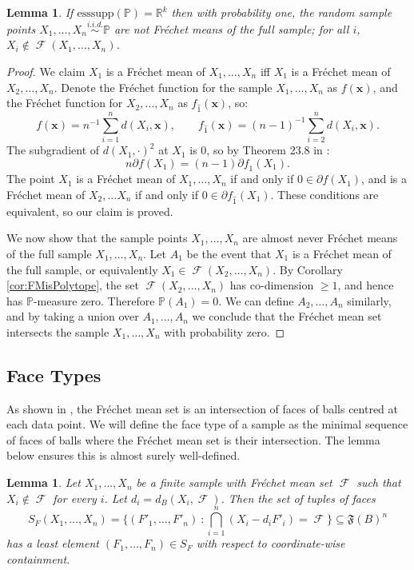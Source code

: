 \documentclass[10pt]{article}
\newtheorem{lemma}[theorem]{Lemma}
\theoremstyle{definition}
\theoremstyle{remark}
\newcommand{\R}{\mathbb{R}}
\newcommand{\esssupp}{\mathrm{esssupp}}
\newcommand{\sample}{ X_1,\dots, X_n}
\DeclareMathOperator{\FMset}{\mathcal{F}}
\renewcommand{\vec}[1]{\mathbf{#1}}
\begin{document}
	\begin{lemma}\label{lemma:data_is_not_FM}
		If $\esssupp(\mathbb P) = \R^k$ then with probability one, the random sample points $ \sample \overset{i.i.d.}{\sim} \mathbb P$ are not Fr\'echet means of the full sample; for all $i$, $X_i \notin \FMset(\sample)$.
	\end{lemma}
	\begin{proof}
		We claim $X_1$ is a Fr\'echet mean of $\sample$ iff $X_1$ is a Fr\'echet mean of $X_2, \dots, X_n$. Denote the Fr\'echet function for the sample $\sample$ as $f(\vec x)$, and the Fr\'echet function for $X_2, \dots, X_n$ as $f_{\hat{1}}(\vec x)$, so:
		\[
		f(\vec x) = n^{-1} \sum_{i=1}^n d(X_i, \vec x), \qquad
		f_{\hat{1}}(\vec x) = (n-1)^{-1} \sum_{i=2}^n d(X_i, \vec x).
		\]
		The subgradient of $d(X_1, \cdot)^2$ at $X_1$ is 0, so by Theorem 23.8 in \cite{rockafellar1970convex}:
		\[
		n \partial f(X_1) = (n-1) \partial f_{\hat{1}}(X_1).
		\]
		The point $X_1$ is a Fr\'echet mean of $\sample$ if and only if $0 \in \partial f(X_1)$, and is a Fr\'echet mean of $X_2, \dots X_{n}$ if and only if $0 \in \partial f_{\hat{1}}(X_1)$. These conditions are equivalent, so our claim is proved.
		
		We now show that the sample points $\sample$ are almost never Fr\'echet means of the full sample $\sample$. Let $A_1$ be the event that $X_1$ is a Fr\'echet mean of the full sample, or equivalently $X_1 \in \FMset(X_2, \dots, X_n)$. By Corollary \ref{cor:FMisPolytope}, the set $\FMset(X_2,\dots, X_n)$ has co-dimension $\geq 1$, and hence has $\mathbb P$-measure zero. Therefore $\mathbb P(A_1) = 0$. We can define $A_2, \dots, A_n$ similarly, and by taking a union over $A_1, \dots, A_n$ we conclude that the Fr\'echet mean set intersects the sample $\sample$ with probability zero.
	\end{proof}
	
	\subsection{Face Types}
	
	As shown in , the Fr\'echet mean set is an intersection of faces of balls centred at each data point. We will define the face type of a sample as the minimal sequence of faces of balls where the Fr\'echet mean set is their intersection. The lemma below ensures this is almost surely well-defined.
	
	\begin{lemma}
		\label{lem:unique_least_face_seq}
		Let $\sample$ be a finite sample with Fr\'echet mean set $\FMset$ such that $X_i \notin \FMset$ for every $i$. Let $d_i = d_B(X_i, \FMset)$. Then the set of tuples of faces
		\[
		S_F(\sample) = \bigg\{ (F'_1, \dots, F'_n) \ : \textstyle \bigcap_{i = 1}^n (X_i - d_i F'_i) = \FMset \bigg\} \subseteq \mathfrak{F}(B)^n
		\]
		has a least element $(F_1, \dots, F_n) \in S_F$ with respect to coordinate-wise containment.
	\end{lemma}
	
\end{document}
